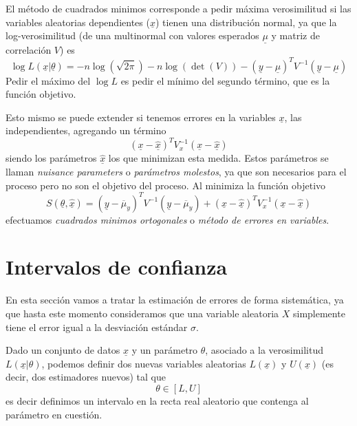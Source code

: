 \documentclass{article}
\numberwithin{equation}{section} %
\begin{document}
El método de cuadrados minimos corresponde a pedir máxima verosimilitud si las variables aleatorias dependientes ($\underline{x}$) tienen una distribución normal,  ya que la log-verosimilitud (de una multinormal con valores esperados $\underline{\mu}$ y matriz de correlación $V$) es
\begin{equation}
\log L(\underline{x}|\underline{\theta}) = - n \log(\sqrt{2\pi}) - n \log(\det(V)) - (\underline{y} - \underline{\mu})^{T} V^{-1} (\underline{y} - \underline{\mu})
\end{equation}
Pedir el máximo del $\log L$ es pedir el mínimo del segundo término, que es la función objetivo. 

Esto mismo se puede extender si tenemos errores en la variables $\underline{x}$, las independientes, agregando un término
\begin{equation}
(\underline{x} - \hat{\underline{x}})^{T} V^{-1}_x (\underline{x} - \hat{\underline{x}})
\end{equation}
siendo los parámetros $\hat{\underline{x}}$ los que minimizan esta medida. Estos parámetros se llaman \emph{nuisance parameters} o \emph{parámetros molestos}, ya que son necesarios para el proceso pero no son el objetivo del proceso. Al minimiza la función objetivo
\begin{equation}
S(\underline{\theta}, \hat{\underline{x}}) = (\underline{y} - \overline{\mu}_y)^{T} V^{-1} (\underline{y} - \overline{\mu}_y) + (\underline{x} - \hat{\underline{x}})^{T} V^{-1}_x (\underline{x} - \hat{\underline{x}})
\end{equation}
efectuamos \emph{cuadrados minimos ortogonales} o \emph{método de errores en variables}.

\section{Intervalos de confianza}
En esta sección vamos a tratar la estimación de errores de forma sistemática, ya que hasta este momento consideramos que una variable aleatoria $X$ simplemente tiene el error igual a la desviación estándar $\sigma$.

Dado un conjunto de datos $\underline{x}$ y un parámetro $\theta$, asociado a la verosimilitud $L(\underline{x}|\theta)$, podemos definir dos nuevas variables aleatorias $L(\underline{x})$ y $U(\underline{x})$ (es decir, dos estimadores nuevos) tal que
\begin{equation}
\theta \in [L, U]
\end{equation}
es decir definimos un intervalo en la recta real aleatorio que contenga al parámetro en cuestión. 
\end{document}
